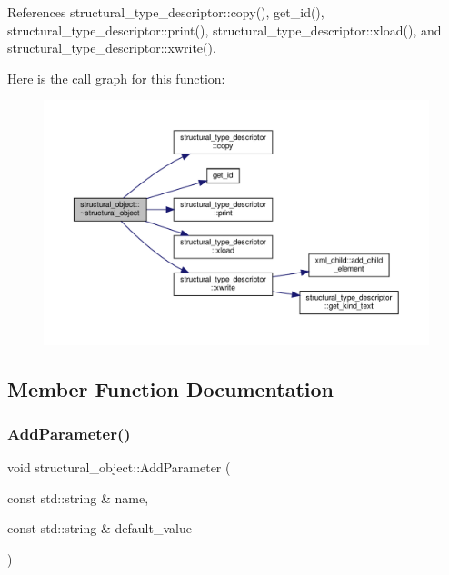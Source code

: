References structural\+\_\+type\+\_\+descriptor\+::copy(), get\+\_\+id(), structural\+\_\+type\+\_\+descriptor\+::print(), structural\+\_\+type\+\_\+descriptor\+::xload(), and structural\+\_\+type\+\_\+descriptor\+::xwrite().

Here is the call graph for this function\+:
\nopagebreak
\begin{figure}[H]
\begin{center}
\leavevmode
\includegraphics[width=350pt]{d8/da3/classstructural__object_ae602f3bc90a576ff01ac7c1811e2c6c0_cgraph}
\end{center}
\end{figure}


\subsection{Member Function Documentation}
\mbox{\label{classstructural__object_a83ccf7f94a7c5d4590f337ff2b97c5b3}} 
\subsubsection{\texorpdfstring{Add\+Parameter()}{AddParameter()}}
{\footnotesize\ttfamily void structural\+\_\+object\+::\+Add\+Parameter (\begin{DoxyParamCaption}\item[{const std\+::string \&}]{name,  }\item[{const std\+::string \&}]{default\+\_\+value }\end{DoxyParamCaption})\hspace{0.3cm}{\ttfamily [virtual]}}



